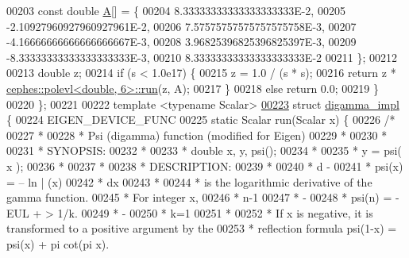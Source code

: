 \begin{DoxyCode}
00203     \textcolor{keyword}{const} \textcolor{keywordtype}{double} \hyperlink{group___core___module_class_eigen_1_1_matrix}{A}[] = \{
00204       8.33333333333333333333E-2,
00205       -2.10927960927960927961E-2,
00206       7.57575757575757575758E-3,
00207       -4.16666666666666666667E-3,
00208       3.96825396825396825397E-3,
00209       -8.33333333333333333333E-3,
00210       8.33333333333333333333E-2
00211     \};
00212 
00213     \textcolor{keywordtype}{double} z;
00214     \textcolor{keywordflow}{if} (s < 1.0e17) \{
00215       z = 1.0 / (s * s);
00216       \textcolor{keywordflow}{return} z * \hyperlink{struct_eigen_1_1internal_1_1cephes_1_1polevl}{cephes::polevl<double, 6>::run}(z, A);
00217     \}
00218     \textcolor{keywordflow}{else} \textcolor{keywordflow}{return} 0.0;
00219   \}
00220 \};
00221 
00222 \textcolor{keyword}{template} <\textcolor{keyword}{typename} Scalar>
\hyperlink{struct_eigen_1_1internal_1_1digamma__impl}{00223} \textcolor{keyword}{struct }\hyperlink{struct_eigen_1_1internal_1_1digamma__impl}{digamma\_impl} \{
00224   EIGEN\_DEVICE\_FUNC
00225   \textcolor{keyword}{static} Scalar run(Scalar x) \{
00226     \textcolor{comment}{/*}
00227 \textcolor{comment}{     *}
00228 \textcolor{comment}{     *     Psi (digamma) function (modified for Eigen)}
00229 \textcolor{comment}{     *}
00230 \textcolor{comment}{     *}
00231 \textcolor{comment}{     * SYNOPSIS:}
00232 \textcolor{comment}{     *}
00233 \textcolor{comment}{     * double x, y, psi();}
00234 \textcolor{comment}{     *}
00235 \textcolor{comment}{     * y = psi( x );}
00236 \textcolor{comment}{     *}
00237 \textcolor{comment}{     *}
00238 \textcolor{comment}{     * DESCRIPTION:}
00239 \textcolor{comment}{     *}
00240 \textcolor{comment}{     *              d      -}
00241 \textcolor{comment}{     *   psi(x)  =  -- ln | (x)}
00242 \textcolor{comment}{     *              dx}
00243 \textcolor{comment}{     *}
00244 \textcolor{comment}{     * is the logarithmic derivative of the gamma function.}
00245 \textcolor{comment}{     * For integer x,}
00246 \textcolor{comment}{     *                   n-1}
00247 \textcolor{comment}{     *                    -}
00248 \textcolor{comment}{     * psi(n) = -EUL  +   >  1/k.}
00249 \textcolor{comment}{     *                    -}
00250 \textcolor{comment}{     *                   k=1}
00251 \textcolor{comment}{     *}
00252 \textcolor{comment}{     * If x is negative, it is transformed to a positive argument by the}
00253 \textcolor{comment}{     * reflection formula  psi(1-x) = psi(x) + pi cot(pi x).}

\end{DoxyCode}
